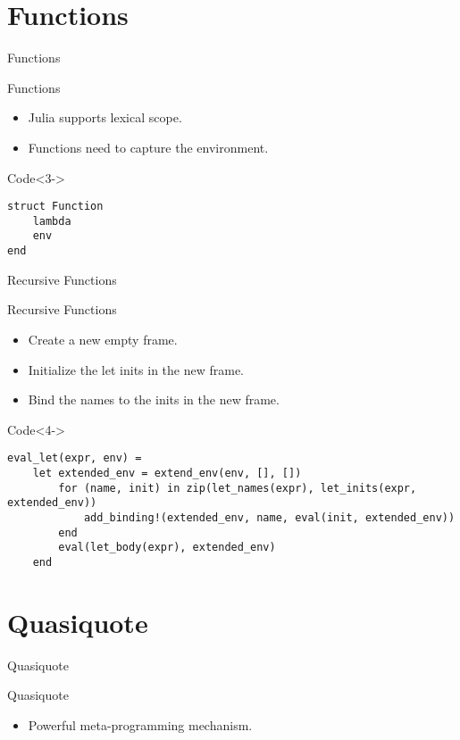 \documentclass[aspectratio=169]{beamer}
\begin{document}
\section{Functions}
\begin{frame}[fragile]{Functions}
    \begin{block}{Functions}
        \begin{itemize}
            \item<1-> Julia supports lexical scope.
            \item<2-> Functions need to capture the environment.
        \end{itemize}
    \end{block}
    \begin{exampleblock}{Code}<3->
        \footnotesize \begin{verbatim}
struct Function
    lambda
    env
end\end{verbatim}
    \end{exampleblock}
\end{frame}

\begin{frame}[fragile]{Recursive Functions}
    \begin{block}{Recursive Functions}
        \begin{itemize}
            \item<1-> Create a new empty frame.
            \item<2-> Initialize the let inits in the new frame.
            \item<3-> Bind the names to the inits in the new frame.
        \end{itemize}
    \end{block}
    \begin{exampleblock}{Code}<4->
        \footnotesize \begin{verbatim}
eval_let(expr, env) =
    let extended_env = extend_env(env, [], [])
        for (name, init) in zip(let_names(expr), let_inits(expr, extended_env))
            add_binding!(extended_env, name, eval(init, extended_env))
        end
        eval(let_body(expr), extended_env)
    end\end{verbatim}
    \end{exampleblock}
\end{frame}

\section{Quasiquote}
\begin{frame}[fragile]{Quasiquote}
    \begin{block}{Quasiquote}
        \begin{itemize}
            \item Powerful meta-programming mechanism.
        \end{itemize}
    \end{block}
\end{frame}
\end{document}
